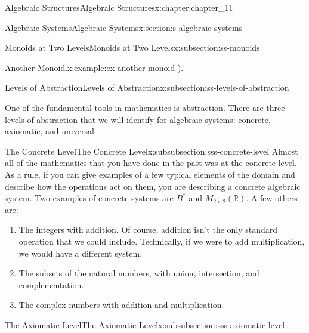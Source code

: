 \documentclass[oneside,10pt,]{book}
\numberwithin{equation}{section}
\begin{document}
\begin{chapterptx}{Algebraic Structures}{}{Algebraic Structures}{}{}{x:chapter:chapter_11}
\begin{sectionptx}{Algebraic Systems}{}{Algebraic Systems}{}{}{x:section:s-algebraic-systems}
\begin{subsectionptx}{Monoids at Two Levels}{}{Monoids at Two Levels}{}{}{x:subsection:ss-monoids}
\begin{example}{Another Monoid.}{x:example:ex-another-monoid}
\right)\).%
\end{example}
\end{subsectionptx}
%
%
\typeout{************************************************}
\typeout{************************************************}
%
\begin{subsectionptx}{Levels of Abstraction}{}{Levels of Abstraction}{}{}{x:subsection:ss-levels-of-abstraction}
%
\begin{introduction}{}%
One of the fundamental tools in mathematics is abstraction. There are three levels of abstraction that we will identify for algebraic systems: concrete, axiomatic, and universal.%
\end{introduction}%
%
%
\typeout{************************************************}
\typeout{************************************************}
%
\begin{subsubsectionptx}{The Concrete Level}{}{The Concrete Level}{}{}{x:subsubsection:sss-concrete-level}
Almost all of the mathematics that you have done in the past was at the concrete level. As a rule, if you can give examples of a few typical elements of the domain and describe how the operations act on them, you are describing a concrete algebraic system. Two examples of concrete systems are \(B^*\) and \(M_{2\times 2}(\mathbb{R})\). A few others are:%
\begin{enumerate}[label=(\alph*)]
\item{}The integers with addition. Of course, addition isn't the only standard operation that we could include. Technically, if we were to add multiplication, we would have a different system.%
\item{}The subsets of the natural numbers, with union, intersection, and complementation.%
\item{}The complex numbers with addition and multiplication.%
\end{enumerate}
%
\end{subsubsectionptx}
%
%
\typeout{************************************************}
\typeout{************************************************}
%
\begin{subsubsectionptx}{The Axiomatic Level}{}{The Axiomatic Level}{}{}{x:subsubsection:sss-axiomatic-level}

\end{subsubsectionptx}
\end{subsectionptx}
\end{sectionptx}
\end{chapterptx}
\end{document}

